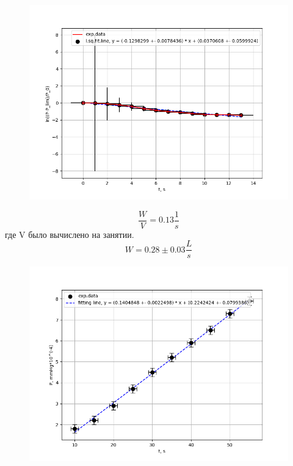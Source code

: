 \documentclass[a4paper,12pt]{article} %
\begin{document}
\begin{figure}[H]
\begin{floatrow}
         {\includegraphics[scale=0.75]{physlabwork_15week_dlogPdt.png}}     
\end{floatrow}
\end{figure}

\begin{equation*}
    \frac{W}{V} = 0.13 \frac{1}{s}
\end{equation*}
где V было вычислено на занятии.
\begin{equation*}
    W = 0.28 \pm 0.03 \frac{L}{s}
\end{equation*}

\begin{figure}[H]
\begin{floatrow}
         {\includegraphics[scale=0.75]{physlabwork_15week_dPdt.png}}     
\end{floatrow}
\end{figure}
\end{document}
